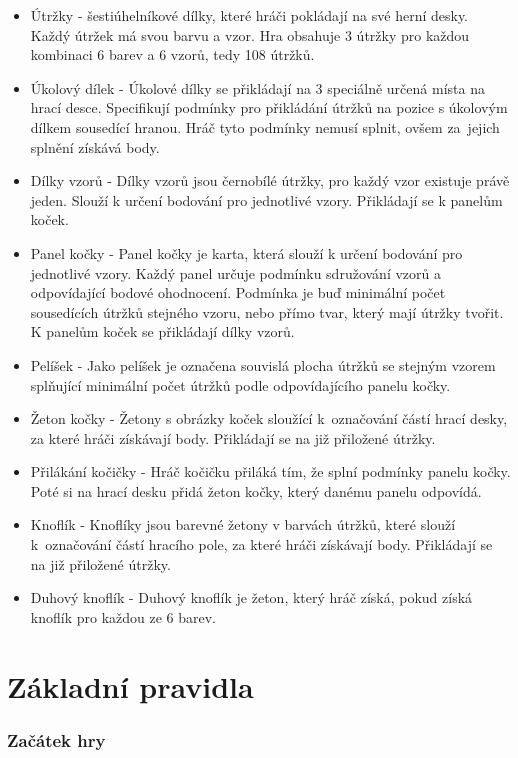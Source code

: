 \begin{itemize}
    \item Útržky - šestiúhelníkové dílky, které hráči pokládají na své herní desky. Každý útržek má svou barvu a vzor. Hra obsahuje 3 útržky pro každou kombinaci 6 barev a 6 vzorů, tedy 108 útržků.
    \item Úkolový dílek - Úkolové dílky se přikládají na 3 speciálně určená místa na hrací desce. Specifikují podmínky pro přikládání útržků na pozice s úkolovým dílkem sousedící hranou. Hráč tyto podmínky nemusí splnit, ovšem za~jejich splnění získává body.
    \item Dílky vzorů - Dílky vzorů jsou černobílé útržky, pro každý vzor existuje právě jeden. Slouží k určení bodování pro jednotlivé vzory. Přikládají se k panelům koček.
    \item Panel kočky - Panel kočky je karta, která slouží k určení bodování pro jednotlivé vzory. Každý panel určuje podmínku sdružování vzorů a odpovídající bodové ohodnocení. Podmínka je buď minimální počet sousedících útržků stejného vzoru, nebo přímo tvar, který mají útržky tvořit. K panelům koček se přikládají dílky vzorů.
    \item Pelíšek - Jako pelíšek je označena souvislá plocha útržků se stejným vzorem splňující minimální počet útržků podle odpovídajícího panelu kočky.
    \item Žeton kočky - Žetony s obrázky koček sloužící k~označování částí hrací desky, za které hráči získávají body. Přikládají se na již přiložené útržky.
    \item Přilákání kočičky - Hráč kočičku přiláká tím, že splní podmínky panelu kočky. Poté si na hrací desku přidá žeton kočky, který danému panelu odpovídá.
    \item Knoflík - Knoflíky jsou barevné žetony v barvách útržků, které slouží k~označování částí hracího pole, za které hráči získávají body. Přikládají se na již přiložené útržky.
    \item Duhový knoflík - Duhový knoflík je žeton, který hráč získá, pokud získá knoflík pro každou ze 6 barev.
\end{itemize}

\section{Základní pravidla}

\subsubsection*{Začátek hry}


